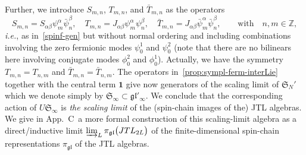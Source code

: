 \documentclass[11pt]{article}
\newcommand{\one}{\boldsymbol{1}}%
\newcommand{\strt}{T}
\newcommand{\bstrt}{\bar{\strt}}
\newcommand{\JTL}[1]{JTL_{#1}}
\newcommand{\sferm}{\psi}
\newcommand{\bsferm}{\bar{\psi}}
\newcommand{\sfermp}{\psi^{2}}
\newcommand{\sfermm}{\psi^{1}}
\newcommand{\phip}{\phi^{2}}
\newcommand{\phim}{\phi^{1}}
\newcommand{\oZ}{\mathbb{Z}}
\newcommand{\interLie}{\mathfrak{S}}
\newcommand{\interfin}[1]{\interLie_{#1}}
\newcommand{\glinfc}{\gl'_{\infty}}
\newcommand{\interinfin}{\interLie_{\infty}}
\newcommand{\gl}{\mathfrak{gl}}
\newcommand{\repgl}{\pi_{\gl}}
\newcommand{\enrg}{S}
\newcommand{\AppLim}{C}
\theoremstyle{definition}
\begin{document}
Further, we introduce  $\enrg_{m,n}$, $\strt_{m,n}$, and $\bstrt_{m,n}$ as the
operators
\begin{equation}\label{prop:sympl-ferm-interLie}
\enrg_{m,n} =S_{\alpha\beta} \psi^{\alpha}_m \bar{\psi}^{\beta}_n,\quad
\strt_{m,n}=J_{\alpha\beta}{\sferm^{\alpha}_{m}\sferm^{\beta}_{n}},\quad \bstrt_{m,n}=J_{\alpha\beta}{\bsferm^{\alpha}_{m}\bsferm^{\beta}_{n}}, \qquad\text{with}\quad n,m\in\oZ,
\end{equation}
{\it i.e.}, as in~\eqref{spinf-gen} but without normal ordering and including combinations involving the zero fermionic modes $\sfermm_0$ and $\sfermp_0$ (note that there are no bilinears here involving conjugate modes $\phip_0$ and $\phim_0$). Actually, we have the symmetry $\strt_{m,n}=\strt_{n,m}$ and $\bstrt_{m,n}=\bstrt_{n,m}$. The operators in~\eqref{prop:sympl-ferm-interLie} together with the central term $\one$ give now generators of the scaling limit of $\interfin{N}'$ which we denote simply by $\interinfin\subset\glinfc$.  We conclude that  the corresponding action of $U\interinfin$ is  \textit{the scaling limit} of the (spin-chain images of the) JTL algebras. We give in App.~\AppLim~a more formal construction of this scaling-limit algebra as a direct/inductive limit $\varinjlim_L \repgl\bigl(\JTL{2L}\bigr)$ of the finite-dimensional spin-chain representations $\repgl$ of the JTL algebras.
\end{document}

